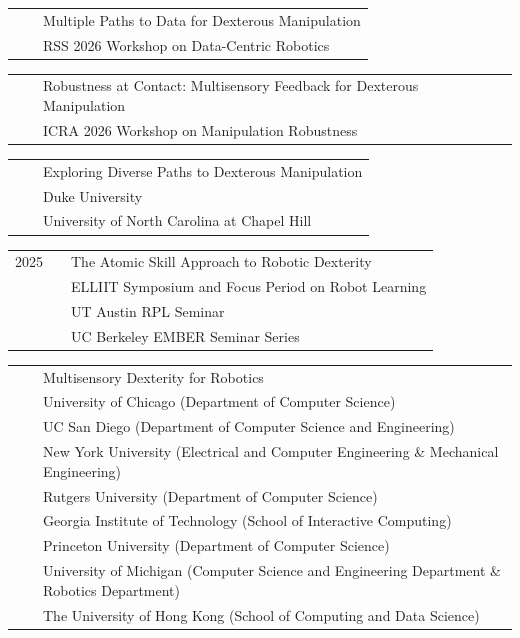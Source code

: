 \documentclass{resume}
\begin{document}
{\renewcommand{\arraystretch}{1.1}
\begin{tabular}{@{}L{0.95cm}L{0.65cm}l@{}}
{} & & {Multiple Paths to Data for Dexterous Manipulation} \\  [-0.02cm]
& & {\small RSS 2026 Workshop on Data-Centric Robotics}
\end{tabular}}

{\renewcommand{\arraystretch}{1.1}
\begin{tabular}{@{}L{0.95cm}L{0.65cm}l@{}}
{} & & {Robustness at Contact: Multisensory Feedback for Dexterous Manipulation} \\  [-0.02cm]
& & {\small ICRA 2026 Workshop on Manipulation Robustness}
\end{tabular}}

{\renewcommand{\arraystretch}{1.1}
\begin{tabular}{@{}L{0.95cm}L{0.65cm}l@{}}
& & {Exploring Diverse Paths to Dexterous Manipulation} \\  [-0.02cm]
& & {\small Duke University} \\ [-0.02cm]
& & {\small University of North Carolina at Chapel Hill}
\end{tabular}}

{\renewcommand{\arraystretch}{1.1}
\begin{tabular}{@{}L{0.95cm}L{0.65cm}l@{}}
{2025} & & {The Atomic Skill Approach to Robotic Dexterity} \\  [-0.02cm]
& & {\small ELLIIT Symposium and Focus Period on Robot Learning} \\ [-0.02cm]
& & {\small UT Austin RPL Seminar} \\ [-0.02cm]
& & {\small UC Berkeley EMBER Seminar Series} \\
\end{tabular}}


{\renewcommand{\arraystretch}{1.1}
\begin{tabular}{@{}L{0.95cm}L{0.65cm}l@{}}
{} & & {Multisensory Dexterity for Robotics} \\  [-0.02cm]
& & {\small University of Chicago (Department of Computer Science)} \\ [-0.02cm]
& & {\small UC San Diego (Department of Computer Science and Engineering)} \\ [-0.02cm]
& & {\small New York University (Electrical and Computer Engineering \& Mechanical Engineering)} \\ [-0.02cm]
& & {\small Rutgers University (Department of Computer Science)} \\ [-0.02cm]
& & {\small Georgia Institute of Technology (School of Interactive Computing)} \\ [-0.02cm]
& & {\small Princeton University (Department of Computer Science)} \\ [-0.02cm]
& & {\small University of Michigan (Computer Science and Engineering Department \& Robotics Department)} \\ [-0.02cm]
& & {\small The University of Hong Kong (School of Computing and Data Science)} \\
\end{tabular}}
\end{document}
